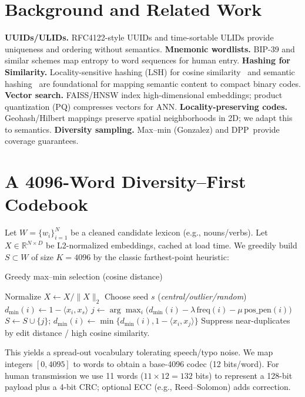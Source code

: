 \documentclass[11pt]{article}
\newcommand{\pq}{\textsc{PQ}}
\newcommand{\dpp}{\textsc{DPP}}
\begin{document}
\section{Background and Related Work}
\textbf{UUIDs/ULIDs.} RFC4122-style UUIDs and time-sortable ULIDs provide uniqueness and ordering without semantics. \textbf{Mnemonic wordlists.} BIP-39 and similar schemes map entropy to word sequences for human entry. \textbf{Hashing for Similarity.} Locality-sensitive hashing (LSH) for cosine similarity~\cite{charikar, andoni} and semantic hashing~\cite{salakhutdinov} are foundational for mapping semantic content to compact binary codes. \textbf{Vector search.} FAISS/HNSW index high-dimensional embeddings; product quantization (\pq) compresses vectors for ANN. \textbf{Locality-preserving codes.} Geohash/Hilbert mappings preserve spatial neighborhoods in 2D; we adapt this to semantics. \textbf{Diversity sampling.} Max--min (Gonzalez) and \dpp\ provide coverage guarantees.

\section{A 4096-Word Diversity--First Codebook}
\label{sec:codebook}
Let $W=\{w_i\}_{i=1}^N$ be a cleaned candidate lexicon (e.g., nouns/verbs). Let $X\in\mathbb{R}^{N\times D}$ be L2-normalized embeddings, cached at load time. We greedily build $S\subset W$ of size $K{=}4096$ by the classic farthest-point heuristic:

\begin{algorithm}[H]
\caption{Greedy max--min selection (cosine distance)}
\begin{algorithmic}[1]
\State Normalize $X \gets X / \|X\|_2$
\State Choose seed $s$ (\emph{central/outlier/random})
\State $d_{\min}(i)\gets 1{-}\langle x_i, x_s\rangle$
  \State $j \gets \arg\max_i \big( d_{\min}(i) - \lambda\, \text{freq}(i) - \mu\, \text{pos\_pen}(i) \big)$
  \State $S\gets S\cup\{j\}$; \quad $d_{\min}(i)\gets \min\{d_{\min}(i), 1{-}\langle x_i,x_j\rangle\}$
  \State Suppress near-duplicates by edit distance / high cosine similarity.
\EndFor
\end{algorithmic}
\end{algorithm}

This yields a spread-out vocabulary tolerating speech/typo noise. We map integers $[0,4095]$ to words to obtain a base-4096 codec (12 bits/word). For human transmission we use 11 words ($11{\times}12=132$ bits) to represent a 128-bit payload plus a 4-bit CRC; optional ECC (e.g., Reed--Solomon) adds correction.
\end{document}
